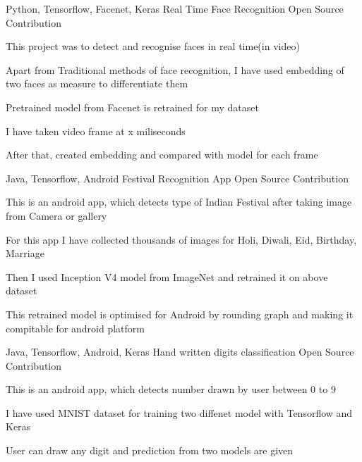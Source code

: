 \begin{cventries}
    \cventry
    {Python, Tensorflow, Facenet, Keras} %
    {Real Time Face Recognition} %
    {Open Source Contribution} %
    {} %
    {
      \begin{cvitems} %
        \item {This project was to detect and recognise faces in real time(in video)}
        \item {Apart from Traditional methods of face recognition, I have used embedding of two faces as measure to differentiate them}
        \item {Pretrained model from Facenet is retrained for my dataset}
        \item {I have taken video frame at x miliseconds}
        \item {After that, created embedding and compared with model for each frame}
      \end{cvitems}
    }

  \cventry
    {Java, Tensorflow, Android} %
    {Festival Recognition App} %
    {Open Source Contribution} %
    {} %
    {
      \begin{cvitems} %
        \item {This is an android app, which detects type of Indian Festival after taking image from Camera or gallery}
        \item {For this app I have collected thousands of images for Holi, Diwali, Eid, Birthday, Marriage}
        \item {Then I used Inception V4 model from ImageNet and retrained it on above dataset}
        \item {This retrained model is optimised for Android by rounding graph and making it compitable for android platform}
      \end{cvitems}
    }

  \cventry
    {Java, Tensorflow, Android, Keras} %
    {Hand written digits classification} %
    {Open Source Contribution} %
    {} %
    {
      \begin{cvitems} %
        \item {This is an android app, which detects number drawn by user between 0 to 9}
        \item {I have used MNIST dataset for training two diffenet model with Tensorflow and Keras }
        \item {User can draw any digit and prediction from two models are given}
      \end{cvitems}
    }
   

\end{cventries}
